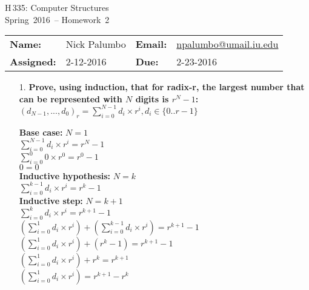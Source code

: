 \documentclass{article}
\makeatletter
\newcommand{\name}{Nick Palumbo}
\newcommand{\email}{\href{mailto:npalumbo@umail.iu.edu?subject=H335 HW2:}{npalumbo@umail.iu.edu}}
\newcommand{\assigned}{2-12-2016}
\newcommand{\due}{2-23-2016}
\newcommand{\thecourse}{H\,335: Computer Structures}
\newcommand{\theterm}{Spring~2016}
\newcommand{\theassignment}{2}
\makeatother
\begin{document}
	\begin{center}
	    {\LARGE \thecourse}\\[3ex]
	    {\Large \theterm\ -- Homework~\theassignment}\\[3ex]
	    \begin{tabular}{llll}
	        \textbf{Name:}&\name&\qquad\qquad\textbf{Email:}&\email\\[0.75ex]
	        \textbf{Assigned:}&\assigned&\qquad\qquad\textbf{Due:}&\due\\[0.75ex]
	    \end{tabular}
	\end{center}

	\begin{enumerate}
		\item[1. ] %
		\textbf{Prove, using induction, that for radix-r, the largest number that can be represented with $N$ digits is $r^N - 1$:} \\

			$(d_{N-1},...,d_0)_r=\sum_{i=0}^{N-1}d_i\times r^i,d_i\in\{0..r-1\}$

			\textbf{Base case:} $N = 1$ \\

			$\sum_{i=0}^{N-1}d_i\times r^i = r^N - 1$ \\

			$\sum_{i=0}^{0}0\times r^0 = r^0 - 1$ \\

			$0 = 0$ \\

			\textbf{Inductive hypothesis:} $N = k$ \\

			$\sum_{i=0}^{k-1}d_i\times r^i = r^k - 1$ \\

			\textbf{Inductive step:} $N = k + 1$ \\

			$\sum_{i=0}^{k}d_i\times r^i = r^{k + 1} - 1$ \\

			$(\sum_{i=0}^{1}d_i\times r^i) + (\sum_{i=0}^{k-1}d_i\times r^i) = r^{k + 1} - 1$ \\

			$(\sum_{i=0}^{1}d_i\times r^i) + (r^k - 1) = r^{k + 1} - 1$ \\

			$(\sum_{i=0}^{1}d_i\times r^i) + r^k = r^{k + 1}$ \\

			$(\sum_{i=0}^{1}d_i\times r^i) = r^{k + 1} - r^k$ \\


\end{enumerate}
\end{document}
